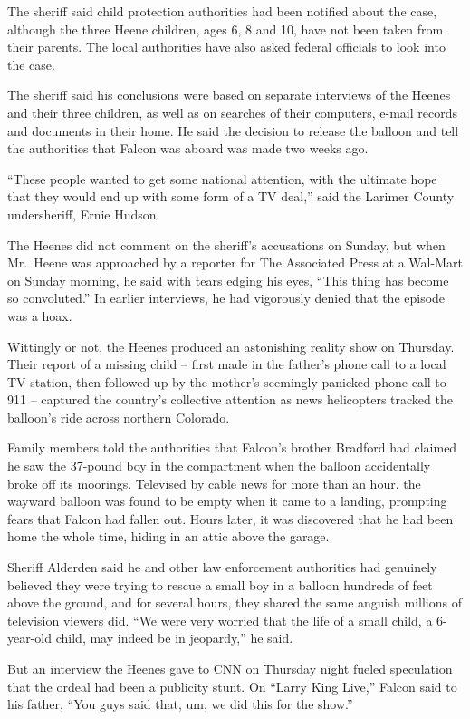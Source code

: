 ﻿\documentclass[12pt]{article}
\begin{document}
The sheriff said child protection authorities had been notified about the case, although the three
Heene children, ages 6, 8 and 10, have not been taken from their parents. The local authorities have
also asked federal officials to look into the case.

The sheriff said his conclusions were based on separate interviews of the Heenes and their three
children, as well as on searches of their computers, e-mail records and documents in their home. He
said the decision to release the balloon and tell the authorities that Falcon was aboard was made
two weeks ago.

``These people wanted to get some national attention, with the ultimate hope that they would end up
with some form of a TV deal,'' said the Larimer County undersheriff, Ernie Hudson.

The Heenes did not comment on the sheriff's accusations on Sunday, but when Mr.~Heene was approached
by a reporter for The Associated Press at a Wal-Mart on Sunday morning, he said with tears edging
his eyes, ``This thing has become so convoluted.'' In earlier interviews, he had vigorously denied
that the episode was a hoax.

Wittingly or not, the Heenes produced an astonishing reality show on Thursday. Their report of a
missing child -- first made in the father's phone call to a local TV station, then followed up by
the mother's seemingly panicked phone call to 911 -- captured the country's collective attention as
news helicopters tracked the balloon's ride across northern Colorado.

Family members told the authorities that Falcon's brother Bradford had claimed he saw the 37-pound
boy in the compartment when the balloon accidentally broke off its moorings. Televised by cable news
for more than an hour, the wayward balloon was found to be empty when it came to a landing,
prompting fears that Falcon had fallen out. Hours later, it was discovered that he had been home the
whole time, hiding in an attic\cite{attic} above the garage.

Sheriff Alderden said he and other law enforcement authorities had genuinely believed they were
trying to rescue a small boy in a balloon hundreds of feet above the ground, and for several hours,
they shared the same anguish millions of television viewers did. ``We were very worried that the
life of a small child, a 6-year-old child, may indeed be in jeopardy\cite{jeopardy},'' he said.

But an interview the Heenes gave to CNN on Thursday night fueled speculation that the ordeal had
been a publicity stunt. On ``Larry King Live,'' Falcon said to his father, ``You guys said that, um,
we did this for the show.''
\end{document}
